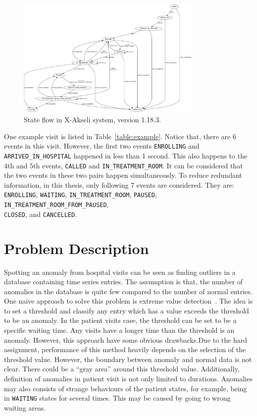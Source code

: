 \begin{figure}
	\begin{center}
		\includegraphics[width=0.8\textwidth]{images/patientFsm}
		\caption{State flow in X-Akseli system, version 1.18.3.}
		\label{fig:state}
	\end{center}
\end{figure}

One example visit is listed in Table~\ref{table:example}. Notice that, there are 6 events in this visit. However, the first two events \texttt{ENROLLING} and  \texttt{ARRIVED\_IN\_HOSPITAL} happened in less than 1 second. This also happens to the 4th and 5th events, \texttt{CALLED} and \texttt{IN\_TREATMENT\_ROOM}. It can be considered that the two events in these two pairs happen simultaneously. To reduce redundant information, in this thesis, only following 7 events are considered. They are: \texttt{ENROLLING}, \texttt{WAITING}, \texttt{IN\_TREATMENT\_ROOM}, \texttt{PAUSED}, \texttt{IN\_TREATMENT\_ROOM\_FROM\_PAUSED}, \\ \texttt{CLOSED}, and \texttt{CANCELLED}.

\section{Problem Description}
Spotting an anomaly from hospital visits can be seen as finding outliers in a database containing time series entries. The assumption is that, the number of anomalies in the database is quite few compared to the number of normal entries. One naive approach to solve this problem is extreme value detection~\cite{aggarwal2013introduction}. The idea is to set a threshold and classify any entry which has a value exceeds the threshold to be an anomaly. In the patient visits case, the threshold can be set to be a specific waiting time. Any visits have a longer time than the threshold is an anomaly. However, this approach have some obvious drawbacks.Due to the hard assignment, performance of this method heavily depends on the selection of the threshold value. However, the boundary between anomaly and normal data is not clear. There could be a ``gray area'' around this threshold value. Additionally, definition of anomalies in patient visit is not only limited to durations. Anomalies may also consists of strange behaviours of the patient states, for example, being in \texttt{WAITING} states for several times. This may be caused by going to wrong waiting areas.

